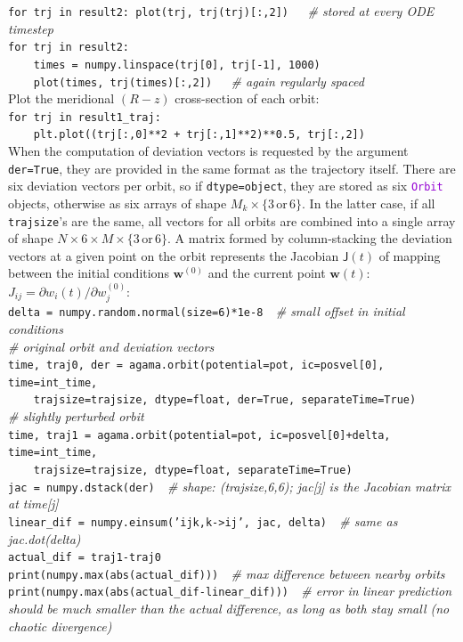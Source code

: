 \documentclass[12pt]{article}
\newcommand{\ttt}[1]{\textcolor{darkviolet}{\texttt{#1}}}
\newcommand{\ppp}[1]{\textcolor{darkolive} {\texttt{#1}}}
\begin{document}
\texttt{for trj in result2: plot(trj, trj(trj)[:,2])\ \ \ }\textit{\color{Sepia}\# stored at every ODE timestep}\\
\texttt{for trj in result2:\\
\mbox{}~~~~times = numpy.linspace(trj[0], trj[-1], 1000)\\
\mbox{}~~~~plot(times, trj(times)[:,2])\ \ \ }\textit{\color{Sepia}\# again regularly spaced} \\[1mm]
Plot the meridional $(R-z)$ cross-section of each orbit:\\[1mm]
\texttt{for trj in result1_traj:\\
\mbox{}~~~~plt.plot((trj[:,0]**2 + trj[:,1]**2)**0.5, trj[:,2])}\\[2mm]
When the computation of deviation vectors is requested by the argument \ppp{der}\texttt{=True}, they are provided in the same format as the trajectory itself. There are six deviation vectors per orbit, so if \ppp{dtype}\texttt{=object}, they are stored as six \ttt{Orbit} objects, otherwise as six arrays of shape $M_k\times\{3\mathrm{\,or\,}6\}$. In the latter case, if all \ppp{trajsize}'s are the same, all vectors for all orbits are combined into a single array of shape $N\times 6 \times M \times\{3\mathrm{\,or\,}6\}$.
A matrix formed by column-stacking the deviation vectors at a given point on the orbit represents the Jacobian $\mathsf{J}(t)$ of mapping between the initial conditions $\boldsymbol w^{(0)}$ and the current point $\boldsymbol w(t)$: $J_{ij} = \partial w_i(t)/\partial w_j^{(0)}$:\\[1mm]
\texttt{delta = numpy.random.normal(size=6)*1e-8\ \ }\textit{\color{Sepia}\# small offset in initial conditions}\\
\textit{\color{Sepia}\# original orbit and deviation vectors}\\
\texttt{time, traj0, der = agama.orbit(potential=pot, ic=posvel[0], time=int_time,\\
\mbox{}~~~~trajsize=trajsize, dtype=float, der=True, separateTime=True)}\\
\textit{\color{Sepia}\# slightly perturbed orbit}\\
\texttt{time, traj1 = agama.orbit(potential=pot, ic=posvel[0]+delta, time=int_time,\\
\mbox{}~~~~trajsize=trajsize, dtype=float, separateTime=True)}\\
\texttt{jac = numpy.dstack(der)\ \ }\textit{\color{Sepia}\# shape: (trajsize,6,6); jac[j] is the Jacobian matrix at time[j]}\\
\texttt{linear_dif = numpy.einsum('ijk,k->ij', jac, delta)\ \ }\textit{\color{Sepia}\# same as jac.dot(delta)}\\
\texttt{actual_dif = traj1-traj0}\\
\texttt{print(numpy.max(abs(actual_dif)))\ \ }\textit{\color{Sepia}\# max difference between nearby orbits}\\
\texttt{print(numpy.max(abs(actual_dif-linear_dif)))\ \ }\textit{\color{Sepia}\# error in linear prediction should be much smaller than the actual difference, as long as both stay small (no chaotic divergence)}
\end{document}
